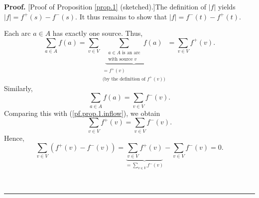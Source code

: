 \documentclass[numbers=enddot,12pt,final,onecolumn,notitlepage]{scrartcl}%
\theoremstyle{definition}
\newenvironment{proof}[1][Proof]{\noindent\textbf{#1.} }{\ \rule{0.5em}{0.5em}}
\let\sumnonlimits\sum
\renewcommand{\sum}{\sumnonlimits\limits}
\begin{document}
\begin{proof}
[Proof of Proposition \ref{prop.1} (sketched).]The definition of $\left\vert
f\right\vert $ yields $\left\vert f\right\vert =f^{+}\left(  s\right)
-f^{-}\left(  s\right)  $. It thus remains to show that $\left\vert
f\right\vert =f^{-}\left(  t\right)  -f^{+}\left(  t\right)  $.

Each arc $a\in A$ has exactly one source. Thus,%
\begin{equation}
\sum_{a\in A}f\left(  a\right)  =\sum_{v\in V}\underbrace{\sum_{\substack{a\in
A\text{ is an arc}\\\text{with source }v}}f\left(  a\right)  }%
_{\substack{=f^{+}\left(  v\right)  \\\text{(by the definition of }%
f^{+}\left(  v\right)  \text{)}}}=\sum_{v\in V}f^{+}\left(  v\right)  .
\label{pf.prop.1.inflow}%
\end{equation}
Similarly,%
\begin{equation}
\sum_{a\in A}f\left(  a\right)  =\sum_{v\in V}f^{-}\left(  v\right)  .
\label{pf.prop.1.outflow}%
\end{equation}
Comparing this with (\ref{pf.prop.1.inflow}), we obtain%
\[
\sum_{v\in V}f^{+}\left(  v\right)  =\sum_{v\in V}f^{-}\left(  v\right)  .
\]
Hence,%
\begin{equation}
\sum_{v\in V}\left(  f^{+}\left(  v\right)  -f^{-}\left(  v\right)  \right)
=\underbrace{\sum_{v\in V}f^{+}\left(  v\right)  }_{=\sum_{v\in V}f^{-}\left(
v\right)  }-\sum_{v\in V}f^{-}\left(  v\right)  =0. \label{pf.prop.1.2}%
\end{equation}



\end{proof}
\end{document}
